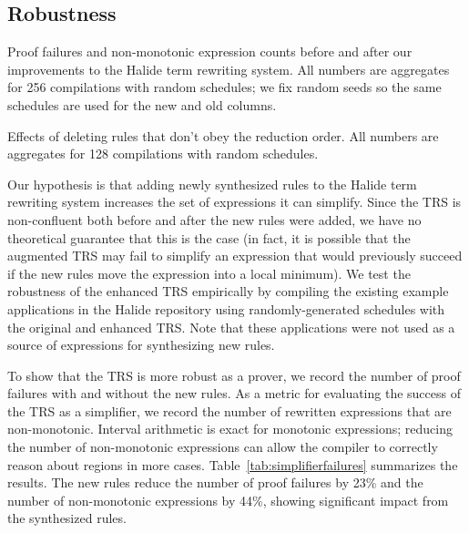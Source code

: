 \documentclass[sigplan,10pt,review,anonymous]{acmart}\settopmatter{printfolios=true,printccs=false,printacmref=false}
\begin{document}
\subsection{Robustness}
\begin{table}[!ht]
  \caption{Proof failures and non-monotonic expression counts before and after our improvements to the Halide term rewriting system.
    All numbers are aggregates for 256 compilations with random schedules; we fix random seeds so
    the same schedules are used for the new and old columns.}
  \label{tab:simplifierfailures}
  \small
  
\end{table}

\begin{table}[!ht]
 \caption{Effects of deleting rules that don't obey the reduction order. All numbers are aggregates for 128 compilations with random schedules.}
 \label{tab:orderingdeletions}
 \small
 
\end{table}

Our hypothesis is that adding newly synthesized rules to the Halide
term rewriting system increases the set of expressions it can simplify. Since the
TRS is non-confluent both before and after the new rules were added, we
have no theoretical guarantee that this is the case (in fact, it is possible
that the augmented TRS may fail to simplify an expression that would
previously succeed if the new rules move the expression into a local
minimum). We test the robustness of the enhanced TRS empirically by
compiling the existing example applications in the Halide repository
using randomly-generated schedules with the original and enhanced TRS.
Note that these applications were not used as a source of expressions for synthesizing new rules.

To show that the TRS is more robust as a prover, we record the number of proof failures with and without the new rules. As a metric for evaluating the success of the TRS as a simplifier, we record the number of rewritten expressions that are non-monotonic. Interval arithmetic is exact for monotonic expressions; reducing the number of non-monotonic expressions can allow the
compiler to correctly reason about regions in more cases. Table~\ref{tab:simplifierfailures} summarizes the results.  The new rules
reduce the number of proof failures by 23\% and the number of non-monotonic expressions
by 44\%, showing significant impact from the synthesized rules.
\end{document}
